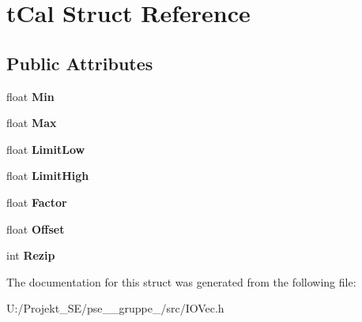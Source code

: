 \hypertarget{structt_cal}{}\section{t\+Cal Struct Reference}
\label{structt_cal}
\subsection*{Public Attributes}
\begin{DoxyCompactItemize}
\item 
\mbox{\label{structt_cal_a79f088eb8b9d818346013996ce2bd023}} 
float {\bfseries Min}
\item 
\mbox{\label{structt_cal_af60af64b5f008a5769ed3c1d4bca42dc}} 
float {\bfseries Max}
\item 
\mbox{\label{structt_cal_ae30831bb3a19b525bad2a5d9e8444611}} 
float {\bfseries Limit\+Low}
\item 
\mbox{\label{structt_cal_a610138930a0bccb068a2a3343ea6c919}} 
float {\bfseries Limit\+High}
\item 
\mbox{\label{structt_cal_a7e6afdae2a9f5b7ca1bffb608ab9345a}} 
float {\bfseries Factor}
\item 
\mbox{\label{structt_cal_abbe3300cabe1547a794c59dc90851fad}} 
float {\bfseries Offset}
\item 
\mbox{\label{structt_cal_af884b30cf010eb754b90e6d8781a7bc5}} 
int {\bfseries Rezip}
\end{DoxyCompactItemize}


The documentation for this struct was generated from the following file\+:\begin{DoxyCompactItemize}
\item 
U\+:/\+Projekt\+\_\+\+S\+E/pse\+\_\+\_\+gruppe\+\_/src/I\+O\+Vec.\+h\end{DoxyCompactItemize}
